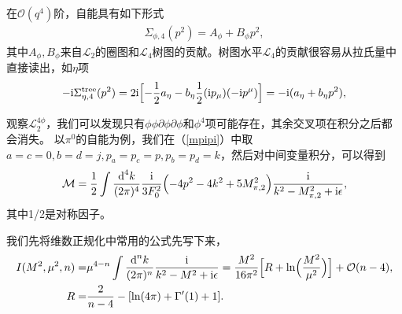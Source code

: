 \documentclass[aps,tightenlines,16pt]{ctexart}
\numberwithin{equation}{section}
\newcommand{\mL}{\mathcal{L}}
\begin{document}
在$\mathcal{O}(q^4)$阶，自能具有如下形式
\begin{align}
   \Sigma_{\phi,4}(p^2) = A_{\phi} + B_{\phi}p^2,
\end{align}
其中$A_{\phi},B_{\phi}$来自$\mL_2$的圈图和$\mL_4$树图的贡献。树图水平$\mL_4$的贡献很容易从拉氏量中直接读出，如$\eta$项
\begin{align}
   -\mbox{i} \Sigma_{\eta,4}^{\text{tree}}(p^2) = 2\mbox{i}\Bigl[-\frac{1}{2}a_{\eta}-b_{\eta}\frac{1}{2}(\mbox{i}p_{\mu})(-\mbox{i}p^{\mu})\Bigr] = -\mbox{i}(a_{\eta}+b_{\eta}p^2),
\end{align}

观察$\mL_2^{4\phi}$，我们可以发现只有$\phi\phi\partial\phi\partial\phi$和$\phi^4$项可能存在，其余交叉项在积分之后都会消失。
以$\pi^0$的自能为例，我们在（\ref{mpipi}）中取$a=c=0,b=d=j,p_a=p_c=p,p_b=p_d=k$，然后对中间变量积分，可以得到
\begin{align}
   \mathcal{M}=\frac{1}{2}\int \frac{\mbox{d}^4k}{(2\pi)^4}\frac{\mbox{i}}{3F_0^2}\Bigl(-4p^2-4k^2+5M_{\pi,2}^2\Bigr)\frac{\mbox{i}}{k^2-M_{\pi,2}^2+\mbox{i}\epsilon},
\end{align}
其中1/2是对称因子。

我们先将维数正规化中常用的公式先写下来，
\begin{align}
   I(M^2,\mu^2,n)=&\mu^{4-n}\int \frac{\mbox{d}^nk}{(2\pi)^n}\frac{\mbox{i}}{k^2-M^2+\mbox{i}\epsilon} = \frac{M^2}{16\pi^2}\Bigl[R+\mbox{ln}\Bigl(\frac{M^2}{\mu^2}\Bigr)\Bigr]+\mathcal{O}(n-4),\\
   R =&\frac{2}{n-4}-[\mbox{ln}(4\pi)+\Gamma^{\prime}(1)+1].
\end{align}
\end{document}
